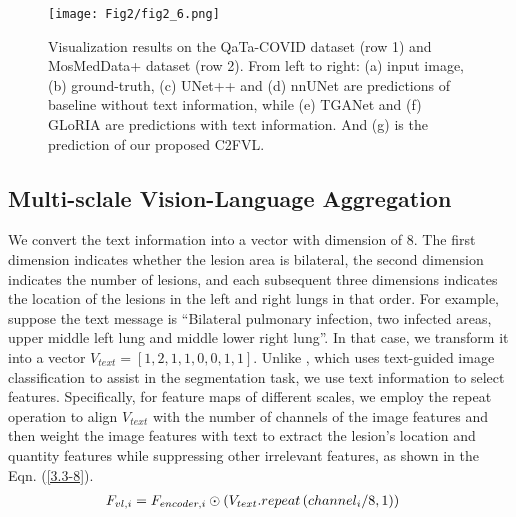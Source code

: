 \documentclass{article}
\begin{document}
\begin{figure*}[!ht]
{\begin{minipage}[t]{0.135\linewidth}
			\vspace{0.02cm}
			\texttt{[image: Fig2/fig2\_6.png]}\\
			\vspace{0.02cm}
		\end{minipage}}
\centering
	\caption{Visualization results on the QaTa-COVID dataset (row 1) and MosMedData+ dataset (row 2). From left to right: (a) input image, (b) ground-truth, (c) UNet++ and (d) nnUNet are predictions of baseline without text information, while (e) TGANet and (f) GLoRIA are predictions with text information. And (g) is the prediction of our proposed C2FVL.}
	\label{visfig}
	\vspace{-0.4cm}
	\label{vis}
\end{figure*}
\vspace{-4mm}
\subsection{Multi-sclale Vision-Language Aggregation}
\vspace{-2mm}
We convert the text information into a vector with dimension of 8. The first dimension indicates whether the lesion area is bilateral, the second dimension indicates the number of lesions, and each subsequent three dimensions indicates the location of the lesions in the left and right lungs in that order. For example, suppose the text message is ``Bilateral pulmonary infection, two infected areas, upper middle left lung and middle lower right lung''. In that case, we transform it into a vector $V_{text}=\left [1,2,1,1,0,0,1,1\right ]$. Unlike \cite{tomar2022tganet}, which uses text-guided image classification to assist in the segmentation task, we use text information to select features. Specifically, for feature maps of different scales, we employ the repeat operation to align $V_{text}$ with the number of channels of the image features and then weight the image features with text to extract the lesion's location and quantity features while suppressing other irrelevant features, as shown in the Eqn. (\ref{3.3-8}).
\vspace{-2mm}
\begin{eqnarray}
\setlength{\abovedisplayskip}{0pt}
\setlength{\belowdisplayskip}{0pt}
& F_{vl,i}= F_{encoder,i}\odot \left ( V_{text}.repeat\left (channel_{i}/8,1\right )\right )\label{3.3-8}
\end{eqnarray}
\end{document}
